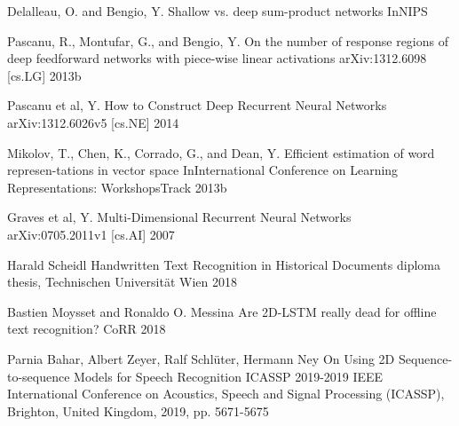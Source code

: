 \documentclass{article}
\begin{document}
\begin{thebibliography}{9}
    Delalleau, O. and Bengio, Y.
    \newblock Shallow vs. deep sum-product networks
    \newblock InNIPS
    
    Pascanu, R., Montufar, G., and Bengio, Y.
    \newblock On the number of response regions of deep feedforward networks with piece-wise linear activations
    \newblock arXiv:1312.6098 [cs.LG] 2013b
    
    Pascanu et al, Y.
    \newblock How to Construct Deep Recurrent Neural Networks
    \newblock arXiv:1312.6026v5 [cs.NE] 2014
    
    Mikolov, T., Chen, K., Corrado, G., and Dean, Y.
    \newblock Efficient estimation of word represen-tations in vector space
    \newblock InInternational Conference on Learning Representations: WorkshopsTrack 2013b
    
    Graves et al, Y.
    \newblock Multi-Dimensional Recurrent Neural Networks
    \newblock arXiv:0705.2011v1  [cs.AI] 2007
    
    Harald Scheidl
    \newblock Handwritten Text Recognition in Historical Documents
    \newblock diploma thesis, Technischen Universität Wien 2018
    
    Bastien Moysset and Ronaldo O. Messina
    \newblock Are 2D-LSTM really dead for offline text recognition?
    \newblock CoRR 2018
    
     Parnia Bahar, Albert Zeyer, Ralf Schlüter, Hermann Ney 
    \newblock On Using 2D Sequence-to-sequence Models for Speech Recognition
    \newblock ICASSP 2019-2019 IEEE International Conference on Acoustics, Speech and Signal Processing (ICASSP), Brighton, United Kingdom, 2019, pp. 5671-5675
        
\end{thebibliography}
\end{document}
